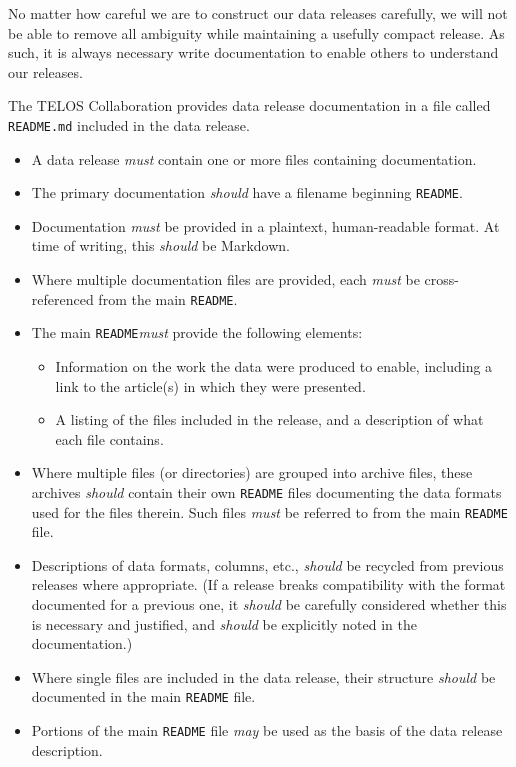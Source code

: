 \documentclass{article}
\newcommand\rfcword[1]{\emph{#1}\xspace}
\newcommand\must{\rfcword{must}}
\newcommand\should{\rfcword{should}}
\newcommand\may{\rfcword{may}}
\newcommand\filename[1]{\texttt{#1}\xspace}
\newcommand\readme{\filename{README}\xspace}
\begin{document}
No matter how careful we are to construct our data releases carefully,
we will not be able to remove all ambiguity while maintaining a usefully compact release.
As such,
it is always necessary write documentation to enable others to understand our releases.

The TELOS Collaboration provides data release documentation in a file called \filename{README.md}
included in the data release.

\begin{itemize}
  \item
        A data release \must contain one or more files containing documentation.
  \item
        The primary documentation \should have a filename beginning \readme.
  \item
        Documentation \must be provided in a plaintext, human-readable format.
        At time of writing,
        this \should be Markdown.
  \item
        Where multiple documentation files are provided,
        each \must be cross-referenced from the main \readme.
  \item
        The main \readme \must provide the following elements:
        \begin{itemize}
          \item
                Information on the work the data were produced to enable,
                including a link to the article(s) in which they were presented.
          \item
                A listing of the files included in the release,
                and a description of what each file contains.
        \end{itemize}
  \item
        Where multiple files (or directories) are grouped into archive files,
        these archives \should contain their own \readme files
        documenting the data formats used for the files therein.
        Such files \must be referred to from the main \readme file.
  \item
        Descriptions of data formats, columns, etc.,
        \should be recycled from previous releases where appropriate.
        (If a release breaks compatibility with the format documented for a previous one,
        it \should be carefully considered whether this is necessary and justified,
        and \should be explicitly noted in the documentation.)
  \item
        Where single files are included in the data release,
        their structure \should be documented in the main \readme file.
  \item
        Portions of the main \readme file \may be used as
        the basis of the data release description.
\end{itemize}
\end{document}
